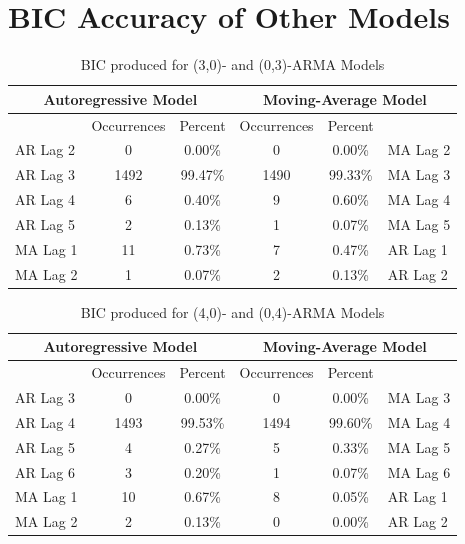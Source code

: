 \documentclass[oneside,12pt,openany]{book}
\begin{document}
\chapter{BIC Accuracy of Other Models}

 \begin{table}[]
    \centering
    \begin{tabular}{|l|c|c|c|c|l|}
        \hline
        \multicolumn{3}{|c|}{Autoregressive Model} & \multicolumn{3}{c|}{Moving-Average Model} \\ \hline
        \cellcolor{black} & Occurrences & Percent & Occurrences & Percent & \cellcolor{black} \\ \hline
        AR Lag 2 & 0 & 0.00\% & 0 & 0.00\% & MA Lag 2 \\ \hline
        AR Lag 3 & 1492 & 99.47\% & 1490 & 99.33\% & MA Lag 3 \\ \hline
        AR Lag 4 & 6 & 0.40\% & 9 & 0.60\% & MA Lag 4 \\ \hline
        AR Lag 5 & 2 & 0.13\% & 1 & 0.07\% & MA Lag 5 \\ \hline
        MA Lag 1 & 11 & 0.73\% & 7 & 0.47\% & AR Lag 1 \\ \hline
        MA Lag 2 & 1 & 0.07\% & 2 & 0.13\% & AR Lag 2 \\ \hline
    \end{tabular}
    \caption{BIC produced for (3,0)- and (0,3)-ARMA Models}
    \label{tab:bic3}
\end{table}

\begin{table}[hbt!]
    \centering
    \begin{tabular}{|l|c|c|c|c|l|}
        \hline
        \multicolumn{3}{|c|}{Autoregressive Model} & \multicolumn{3}{c|}{Moving-Average Model} \\ \hline
        \cellcolor{black} & Occurrences & Percent & Occurrences & Percent & \cellcolor{black} \\ \hline
        AR Lag 3 & 0 & 0.00\% & 0 & 0.00\% & MA Lag 3 \\ \hline
        AR Lag 4 & 1493 & 99.53\% & 1494 & 99.60\% & MA Lag 4 \\ \hline
        AR Lag 5 & 4 & 0.27\% & 5 & 0.33\% & MA Lag 5 \\ \hline
        AR Lag 6 & 3 & 0.20\% & 1 & 0.07\% & MA Lag 6 \\ \hline
        MA Lag 1 & 10 & 0.67\% & 8 & 0.05\% & AR Lag 1 \\ \hline
        MA Lag 2 & 2 & 0.13\% & 0 & 0.00\% & AR Lag 2 \\ \hline
    \end{tabular}
    \caption{BIC produced for (4,0)- and (0,4)-ARMA Models}
    \label{tab:bic4}
\end{table}
\end{document}
